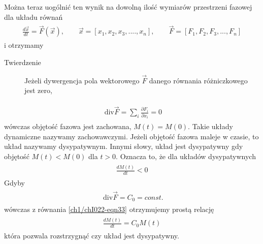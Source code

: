 \documentclass[a4paper,12pt,polish]{sphinxmanual}
\begin{document}
Można teraz uogólnić ten wynik na dowolną ilość wymiarów przestrzeni fazowej  dla układu równań
\label{ch1/chI022:equation-eqn34}\begin{gather}
\begin{split}\frac{d\vec x}{dt} = \vec F (\vec x), \quad \quad \vec x = [x_1, x_2, x_3, ...., x_n], \quad \quad \vec F = [F_1, F_2, F_3, ..., F_n]\end{split}\label{ch1/chI022-eqn34}
\end{gather}
i otrzymamy
\begin{description}
\item[{Twierdzenie}] \leavevmode
Jeżeli dywergencja pola wektorowego $\vec F$  danego równania różniczkowego jest zero,

\end{description}
\label{ch1/chI022:equation-eqn35}\begin{gather}
\begin{split}\mbox{ div} \vec F = \sum_i \frac{\partial F_i}{\partial x_i} = 0\end{split}\label{ch1/chI022-eqn35}
\end{gather}
wówczas objętość fazowa jest zachowana, $M(t) = M(0)$. Takie układy dynamiczne nazywamy zachowawczymi. Jeżeli objętość fazowa maleje w czasie, to układ nazywamy dysypatywnym. Innymi słowy, układ jest dysypatywny gdy objętość $M(t) < M(0)$ dla $t>0$. Oznacza to, że dla układów dysypatywnych
\label{ch1/chI022:equation-eqn36}\begin{gather}
\begin{split}\frac{dM(t)}{dt} < 0\end{split}\label{ch1/chI022-eqn36}
\end{gather}
Gdyby
\label{ch1/chI022:equation-eqn37}\begin{gather}
\begin{split}\mbox{ div} \vec F = C_0 = const.\end{split}\label{ch1/chI022-eqn37}
\end{gather}
wówczas z równania \eqref{ch1/chI022-eqn33} otrzymujemy prostą relację
\label{ch1/chI022:equation-eqn38}\begin{gather}
\begin{split}\frac{dM(t)}{dt} = C_0 M(t)\end{split}\label{ch1/chI022-eqn38}
\end{gather}
która pozwala rozstrzygnąć czy układ jest dysypatywny.
\end{document}
